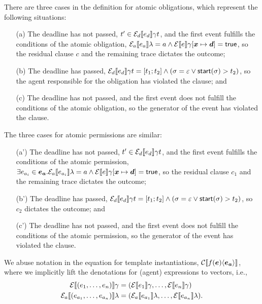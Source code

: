 \documentclass[orivec,final]{llncs-href}
\newcommand{\tracestart}{\mathsf{start}}
\newcommand{\trace}{\sigma}
\newcommand{\emptytrace}{\varepsilon}
\newcommand{\cinstantiate}[3]{#1(#2)\langle#3\rangle}
\newcommand{\ctrue}{\mathsf{true}}
\newcommand{\cinstantiatedefault}{\cinstantiate{f}{\vec{e}}{\vec{e_a}}}
\begin{document}
There are three cases in the definition for atomic
obligations, which represent the following situations:
\begin{itemize}
\item[(a)] The deadline has not passed, $t' \in
  \mathcal{E}_d\llbracket e_d \rrbracket \gamma t$, and the first event fulfills the 
  conditions of the atomic obligation, $\cdenaexp{e_a}{\lambda} = a
  \land \cdenexp{e}{\gamma[\vec{x} \mapsto \vec{d}]} = \ctrue$, so
  the residual clause $c$ and the remaining trace dictates the outcome;
\item[(b)] The deadline has passed, $\cdendexp{e_d}{\gamma}{t} =
  [t_1;t_2] \land (\trace = \emptytrace \lor \tracestart(\trace) >
  t_2)$, so the agent responsible for the obligation has violated the
  clause; and
\item[(c)] The deadline has not passed, and the first event does not
  fulfill the conditions of the atomic obligation, so the generator of
  the event has violated the clause.
\end{itemize}
The three cases for atomic permissions are similar:
\begin{itemize}
\item[(a')] The deadline has not passed, $t' \in
  \mathcal{E}_d\llbracket e_d \rrbracket \gamma t$, and the first event fulfills
  the conditions of the atomic permission, $\exists
  e_{a_i} \in \vec{e_a}. \cdenaexp{e_{a_i}}{\lambda} = a \land \cdenexp{e}{\gamma[\vec{x}
    \mapsto \vec{d}]} = \ctrue$, so the residual clause $c_1$ and the
  remaining trace dictates the outcome;
\item[(b')] The deadline has passed, $\cdendexp{e_d}{\gamma}{t} =
  [t_1;t_2] \land (\trace = \emptytrace \lor \tracestart(\trace) >
  t_2)$, so $c_2$ dictates the outcome; and
\item[(c')] The deadline has not passed, and the first event does not
  fulfill the conditions of the atomic permission, so the generator of
  the event has violated the clause.
\end{itemize}
We abuse notation in the equation for template instantiations,
$\cdenclause{\cinstantiatedefault}{}{}{}{}{}$, where we implicitly
lift the denotations for (agent) expressions to vectors, i.e.,
\begin{align*}
  \mathcal{E}\llbracket (e_1,\ldots,e_n) \rrbracket \gamma &=
  (\mathcal{E}\llbracket e_1 \rrbracket \gamma,\ldots,\mathcal{E}\llbracket e_n \rrbracket \gamma)\\
  \mathcal{E}_a\llbracket (e_{a_1},\ldots,e_{a_n}) \rrbracket \lambda &= 
  (\mathcal{E}_a\llbracket e_{a_1} \rrbracket \lambda,\ldots,\mathcal{E}\llbracket e_{a_n} \rrbracket \lambda).
\end{align*}
\end{document}
